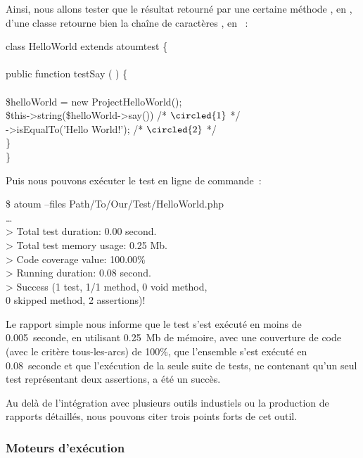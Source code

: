 \begin{example}

Ainsi, nous allons tester que le résultat retourné par une certaine méthode
, en , d'une classe 
retourne bien la chaîne de caractères , en ~:
%
\begin{pre}
class HelloWorld extends \bslash{}atoum\bslash{}test \{ \\
 \\
    public function testSay ( ) \{ \\
 \\
        \$helloWorld = new \bslash{}Project\bslash{}HelloWorld(); \\
        \$this->string(\$helloWorld->say())      /* \(\circled{1}\) */ \\
                  ->isEqualTo('Hello World!'); /* \(\circled{2}\) */ \\
    \} \\
\}
\end{pre}
%
Puis nous pouvons exécuter le test en ligne de commande~:
%
\begin{pre}
\$ atoum --files Path/To/Our/Test/HelloWorld.php \\
… \\
> Total test duration: 0.00 second. \\
> Total test memory usage: 0.25 Mb. \\
> Code coverage value: 100.00\% \\
> Running duration: 0.08 second. \\
> Success (1 test, 1/1 method, 0 void method, \\
           0 skipped method, 2 assertions)!
\end{pre}
%
Le rapport simple nous informe que le test s'est exécuté en moins de
0.005~seconde, en utilisant 0.25~Mb de mémoire, avec une couverture de code
(avec le critère tous-les-arcs) de 100\%, que l'ensemble s'est exécuté en
0.08~seconde et que l'exécution de la seule suite de tests, ne contenant qu'un
seul test représentant deux assertions, a été un succès.

\end{example}

Au delà de l'intégration avec plusieurs outils industiels ou la production de
rapports détaillés, nous pouvons citer trois points forts de cet outil.

\subsubsection{Moteurs d'exécution}

